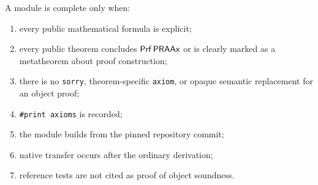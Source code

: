 A module is complete only when:
\begin{enumerate}[label=(\arabic*)]
  \item every public mathematical formula is explicit;
  \item every public theorem concludes \(\mathsf{Prf}\,\mathsf{PRAAx}\) or is clearly marked as a metatheorem about proof construction;
  \item there is no \texttt{sorry}, theorem-specific \texttt{axiom}, or opaque semantic replacement for an object proof;
  \item \texttt{\#print axioms} is recorded;
  \item the module builds from the pinned repository commit;
  \item native transfer occurs after the ordinary derivation;
  \item reference tests are not cited as proof of object soundness.
\end{enumerate}

